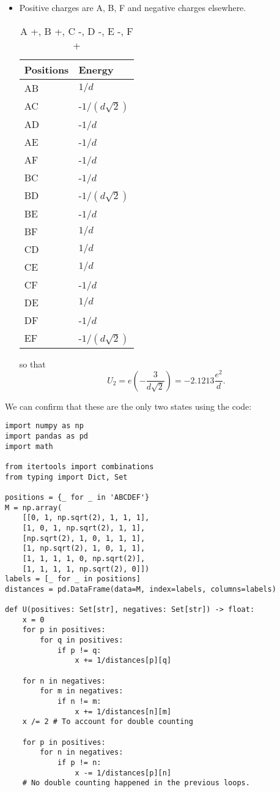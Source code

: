 \documentclass{article}
\begin{document}
\begin{enumerate}
\begin{itemize}
\item Positive charges are A, B, F and negative charges elsewhere.
\begin{table}[ht!]
\center
\begin{tabular}{ll}
Positions & Energy  \\
\hline
AB & $1/d$ \\
AC & -$1/(d\sqrt{2})$ \\
AD & -$1/d$ \\
AE & -$1/d$ \\
AF & -$1/d$ \\
BC & -$1/d$ \\
BD & -$1/(d\sqrt{2})$ \\
BE & -$1/d$ \\
BF & $1/d$ \\
CD & $1/d$ \\
CE & $1/d$ \\
CF & -$1/d$ \\
DE & $1/d$ \\
DF & -$1/d$ \\
EF & -$1/(d\sqrt{2})$
\end{tabular}
\caption{A +, B +, C -, D -, E -, F +}
\end{table}
so that
\[
U_2 = e\left(-\frac{3}{d\sqrt{2}}\right) = -2.1213\frac{e^2}{d}.
\]
\end{itemize}
We can confirm that these are the only two states using the code:
\begin{verbatim}
import numpy as np
import pandas as pd
import math

from itertools import combinations
from typing import Dict, Set

positions = {_ for _ in 'ABCDEF'}
M = np.array(
    [[0, 1, np.sqrt(2), 1, 1, 1],
    [1, 0, 1, np.sqrt(2), 1, 1],
    [np.sqrt(2), 1, 0, 1, 1, 1],
    [1, np.sqrt(2), 1, 0, 1, 1],
    [1, 1, 1, 1, 0, np.sqrt(2)],
    [1, 1, 1, 1, np.sqrt(2), 0]])
labels = [_ for _ in positions]
distances = pd.DataFrame(data=M, index=labels, columns=labels)

def U(positives: Set[str], negatives: Set[str]) -> float:
    x = 0
    for p in positives:
        for q in positives:
            if p != q:
                x += 1/distances[p][q]

    for n in negatives:
        for m in negatives:
            if n != m:
                x += 1/distances[n][m]
    x /= 2 # To account for double counting
    
    for p in positives:
        for n in negatives:
            if p != n:
                x -= 1/distances[p][n]
    # No double counting happened in the previous loops.


\end{verbatim}
\end{enumerate}
\end{document}

